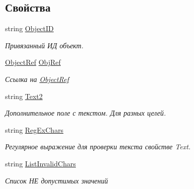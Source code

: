 \subsection*{Свойства}
\begin{DoxyCompactItemize}
\item 
string \mbox{\hyperlink{class_f_b_a_1_1_combo_box_f_b_a_a5a6687cb43572db12ca96590b4a7c0ce}{Object\+ID}}
\begin{DoxyCompactList}\small\item\em Привязанный ИД объект. \end{DoxyCompactList}\item 
\mbox{\hyperlink{class_f_b_a_1_1_object_ref}{Object\+Ref}} \mbox{\hyperlink{class_f_b_a_1_1_combo_box_f_b_a_a34e0763764dad7ab9cd3f42cc667e815}{Obj\+Ref}}
\begin{DoxyCompactList}\small\item\em Ссылка на \mbox{\hyperlink{class_f_b_a_1_1_object_ref}{Object\+Ref}} \end{DoxyCompactList}\item 
string \mbox{\hyperlink{class_f_b_a_1_1_combo_box_f_b_a_a43be64d3254b5fa46243e1e4849c2f50}{Text2}}
\begin{DoxyCompactList}\small\item\em Дополнительное поле с текстом. Для разных целей. \end{DoxyCompactList}\item 
string \mbox{\hyperlink{class_f_b_a_1_1_combo_box_f_b_a_ac25632b289b8ae6f3067976a8185a8dd}{Reg\+Ex\+Chars}}
\begin{DoxyCompactList}\small\item\em Регулярное выражение для проверки текста свойстве Text. \end{DoxyCompactList}\item 
string \mbox{\hyperlink{class_f_b_a_1_1_combo_box_f_b_a_a96646ca59ed6c150c9602cd469d2eae1}{List\+Invalid\+Chars}}
\begin{DoxyCompactList}\small\item\em Список НЕ допустимых значений \end{DoxyCompactList}\item 

\end{DoxyCompactItemize}
